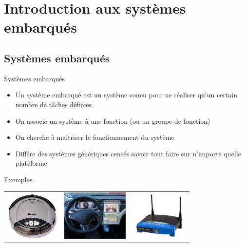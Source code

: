 \section{Introduction aux systèmes embarqués}

\subsection{Systèmes embarqués}
\begin{frame}{Systèmes embarqués}
  \begin{itemize}
  \item Un système embarqué est un système concu pour ne réaliser qu'un certain nombre de tâches définies
  \item On associe un système à une fonction (ou un groupe de fonction)
  \item On cherche à maitriser le fonctionnement du système
  \item Différe des systèmes génériques censés savoir tout faire sur n'importe quelle plateforme
  \end{itemize}
\end{frame}

\begin{frame}{Exemples}
  \begin{tabular}{ccc}
    \includegraphics[height=2.5cm]{pictures/roomba.jpg} & \hspace{1.5cm}
    \includegraphics[height=2.5cm]{pictures/tesla.jpg} & \hspace{1.5cm}
    \includegraphics[height=2.5cm]{pictures/router.jpg}
  \end{tabular}
\end{frame}

